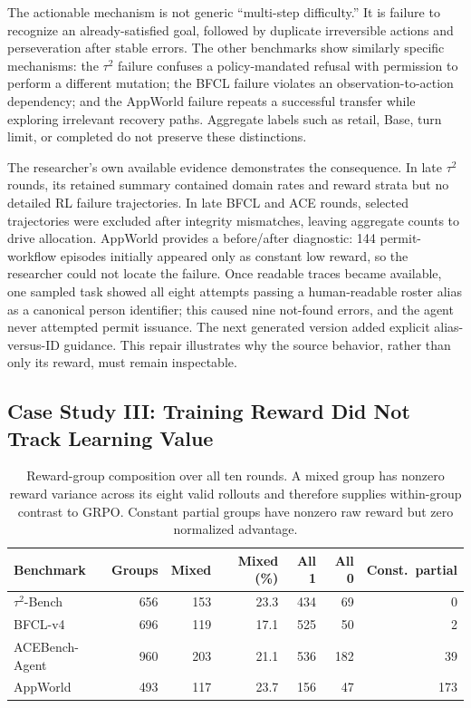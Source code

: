 The actionable mechanism is not generic ``multi-step difficulty.'' It is failure to recognize an already-satisfied goal, followed by duplicate irreversible actions and perseveration after stable errors. The other benchmarks show similarly specific mechanisms: the $\tau^2$ failure confuses a policy-mandated refusal with permission to perform a different mutation; the BFCL failure violates an observation-to-action dependency; and the AppWorld failure repeats a successful transfer while exploring irrelevant recovery paths. Aggregate labels such as retail, Base, turn limit, or completed do not preserve these distinctions.

The researcher's own available evidence demonstrates the consequence. In late $\tau^2$ rounds, its retained summary contained domain rates and reward strata but no detailed RL failure trajectories. In late BFCL and ACE rounds, selected trajectories were excluded after integrity mismatches, leaving aggregate counts to drive allocation. AppWorld provides a before/after diagnostic: 144 permit-workflow episodes initially appeared only as constant low reward, so the researcher could not locate the failure. Once readable traces became available, one sampled task showed all eight attempts passing a human-readable roster alias as a canonical person identifier; this caused nine not-found errors, and the agent never attempted permit issuance. The next generated version added explicit alias-versus-ID guidance. This repair illustrates why the source behavior, rather than only its reward, must remain inspectable.

\subsection{Case Study III: Training Reward Did Not Track Learning Value}

\begin{table}[ht]
\color{blue}
\centering\small
\caption{Reward-group composition over all ten rounds. A mixed group has nonzero reward variance across its eight valid rollouts and therefore supplies within-group contrast to GRPO. Constant partial groups have nonzero raw reward but zero normalized advantage.}
\label{tab:codex_reward_groups}
\begin{tabular}{@{}lrrrrrr@{}}
\toprule
Benchmark & Groups & Mixed & Mixed (\%) & All 1 & All 0 & Const.\ partial \\
\midrule
$\tau^2$-Bench & 656 & 153 & 23.3 & 434 & 69 & 0 \\
BFCL-v4 & 696 & 119 & 17.1 & 525 & 50 & 2 \\
ACEBench-Agent & 960 & 203 & 21.1 & 536 & 182 & 39 \\
AppWorld & 493 & 117 & 23.7 & 156 & 47 & 173 \\
\bottomrule
\end{tabular}
\end{table}

